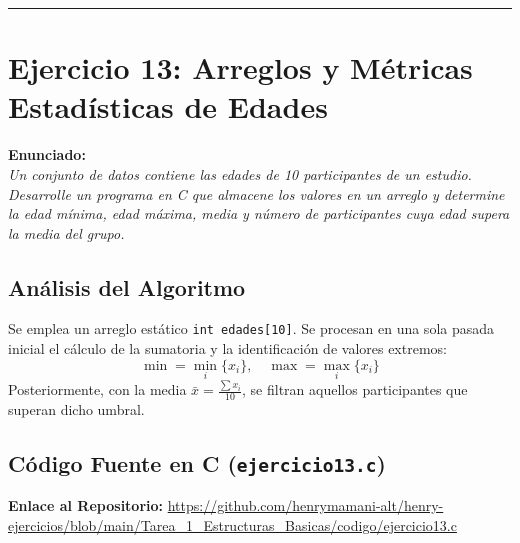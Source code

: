\documentclass[12pt]{article}
\begin{document}
\vspace{5mm}
\hrule
\newpage

\section*{Ejercicio 13: Arreglos y Métricas Estadísticas de Edades}

\noindent\textbf{Enunciado:}\\
\textit{Un conjunto de datos contiene las edades de 10 participantes de un estudio. Desarrolle un programa en C que almacene los valores en un arreglo y determine la edad mínima, edad máxima, media y número de participantes cuya edad supera la media del grupo.}

\subsection*{Análisis del Algoritmo}
Se emplea un arreglo estático \texttt{int edades[10]}. Se procesan en una sola pasada inicial el cálculo de la sumatoria y la identificación de valores extremos:
\[ \min = \min_{i} \{x_i\}, \quad \max = \max_{i} \{x_i\} \]
Posteriormente, con la media $\bar{x} = \frac{\sum x_i}{10}$, se filtran aquellos participantes que superan dicho umbral.

\subsection*{Código Fuente en C (\texttt{ejercicio13.c})}
\noindent\textbf{Enlace al Repositorio:} \url{https://github.com/henrymamani-alt/henry-ejercicios/blob/main/Tarea_1_Estructuras_Basicas/codigo/ejercicio13.c}
\end{document}

